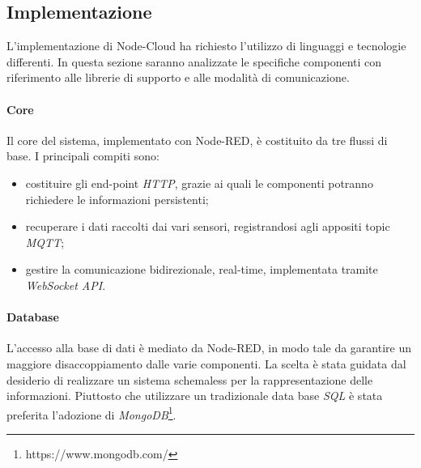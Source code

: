 \documentclass{article}
\begin{document}
\subsection{Implementazione}
L’implementazione di Node-Cloud ha richiesto l’utilizzo di linguaggi e tecnologie differenti. In questa sezione saranno analizzate le specifiche componenti con riferimento alle librerie di supporto e alle modalità di comunicazione.
\paragraph{Core}
Il core del sistema, implementato con Node-RED, è costituito da tre flussi di base. I principali compiti sono:
\begin{itemize}
    \item costituire gli end-point \emph{HTTP}, grazie ai quali le componenti potranno richiedere le informazioni persistenti;
    \item recuperare i dati raccolti dai vari sensori, registrandosi agli appositi topic \emph{MQTT};
    \item gestire la comunicazione bidirezionale, real-time, implementata tramite \emph{WebSocket API}.
\end{itemize}
\paragraph{Database}
L’accesso alla base di dati è mediato da Node-RED, in modo tale da garantire un maggiore disaccoppiamento dalle varie componenti. La scelta è stata guidata dal desiderio di realizzare un sistema schemaless per la rappresentazione delle informazioni. Piuttosto che utilizzare un tradizionale data base \emph{SQL} è stata preferita l’adozione di \emph{MongoDB}\footnote{https://www.mongodb.com/}.
\end{document}
